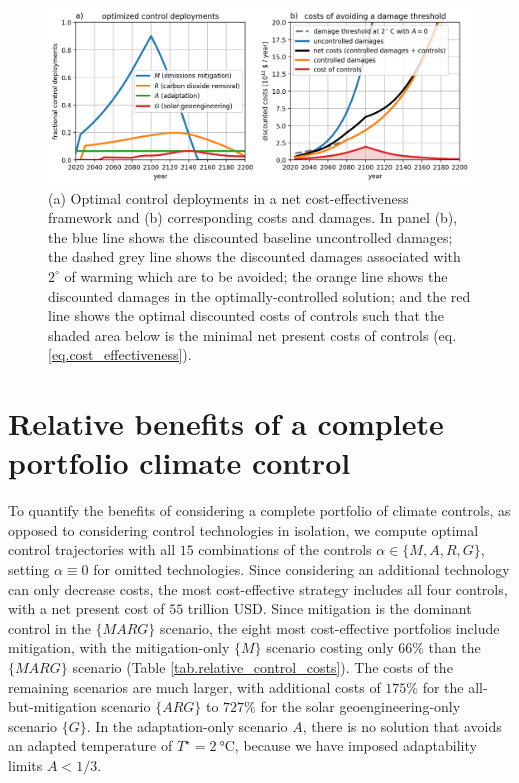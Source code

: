 \documentclass{article}
\begin{document}
\begin{figure}[htb!]
\noindent\includegraphics[width=1.0\textwidth]{figures/default-temp_controls_and_damages.png}
\centering
\caption{(a) Optimal control deployments in a net cost-effectiveness framework and (b) corresponding costs and damages. In panel (b), the blue line shows the discounted baseline uncontrolled damages; the dashed grey line shows the discounted damages associated with $2^{\circ}$ of warming which are to be avoided; the orange line shows the discounted damages in the optimally-controlled solution; and the red line shows the optimal discounted costs of controls such that the shaded area below is the minimal net present costs of controls (eq. \ref{eq.cost_effectiveness}).}
\label{fig.approach2}
\end{figure}

\section{Relative benefits of a complete portfolio climate control}
To quantify the benefits of considering a complete portfolio of climate controls, as opposed to considering control technologies in isolation, we compute optimal control trajectories with all $15$ combinations of the controls $\alpha \in \{M, A, R, G\}$, setting $\alpha \equiv 0$ for omitted technologies. Since considering an additional technology can only decrease costs, the most cost-effective strategy includes all four controls, with a net present cost of $55$ trillion USD. Since mitigation is the dominant control in the $\{MARG\}$ scenario, the eight most cost-effective portfolios include mitigation, with the mitigation-only $\{M\}$ scenario costing only $66\%$ than the $\{MARG\}$ scenario (Table \ref{tab.relative_control_costs}). The costs of the remaining scenarios are much larger, with additional costs of $175\%$ for the all-but-mitigation scenario $\{ARG\}$ to $727\%$ for the solar geoengineering-only scenario $\{G\}$. In the adaptation-only scenario $A$, there is no solution that avoids an adapted temperature of $T^{\star} = \SI{2}{\celsius}$, because we have imposed adaptability limits $A < 1/3$.
\end{document}

